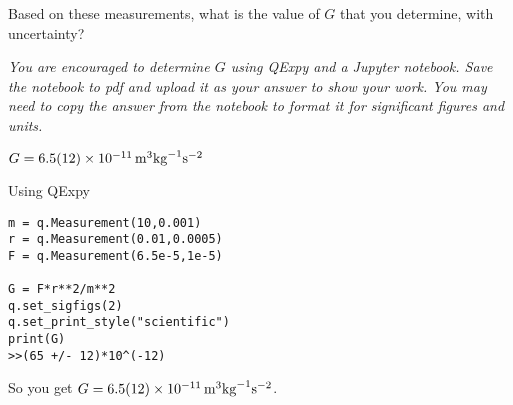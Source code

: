 Based on these measurements, what is the value of $G$ that you determine, with uncertainty?

\textit{You are encouraged to determine $G$ using QExpy and a Jupyter notebook. Save the notebook to pdf and upload it as your answer to show your work. You may need to copy the answer from the notebook to format it for significant figures and units.}

\begin{finalanswer}
$G=\SI{6.5\pm 1.2e-11}{m^3 kg^{-1} s^{-2}}$
\end{finalanswer}

\begin{solution}
Using QExpy
\begin{verbatim}
m = q.Measurement(10,0.001)
r = q.Measurement(0.01,0.0005)
F = q.Measurement(6.5e-5,1e-5)

G = F*r**2/m**2
q.set_sigfigs(2)
q.set_print_style("scientific")
print(G)
>>(65 +/- 12)*10^(-12)
\end{verbatim}
So you get $G=\SI{6.5\pm 1.2e-11}{m^3 kg^{-1} s^{-2}}$.
\end{solution}

